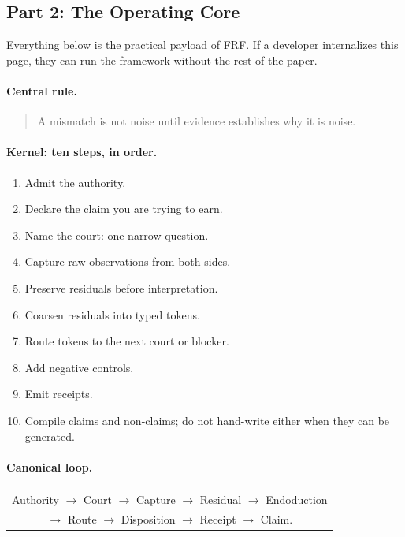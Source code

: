 \documentclass[11pt,a4paper]{article}
\newcommand{\frf}{\textsc{FRF}}
\begin{document}
\subsection{Part 2: The Operating Core}

Everything below is the practical payload of \frf{}. If a developer internalizes this page, they can run the framework without the rest of the paper.

\paragraph{Central rule.}
\begin{quote}
A mismatch is not noise until evidence establishes why it is noise.
\end{quote}

\paragraph{Kernel: ten steps, in order.}
\begin{enumerate}
\item Admit the authority.
\item Declare the claim you are trying to earn.
\item Name the court: one narrow question.
\item Capture raw observations from both sides.
\item Preserve residuals before interpretation.
\item Coarsen residuals into typed tokens.
\item Route tokens to the next court or blocker.
\item Add negative controls.
\item Emit receipts.
\item Compile claims and non-claims; do not hand-write either when they can be generated.
\end{enumerate}

\paragraph{Canonical loop.}
\begin{center}
\small
\begin{tabular}{c}
Authority \(\rightarrow\) Court \(\rightarrow\) Capture \(\rightarrow\) Residual \(\rightarrow\) Endoduction\\
\(\rightarrow\) Route \(\rightarrow\) Disposition \(\rightarrow\) Receipt \(\rightarrow\) Claim.
\end{tabular}
\end{center}
\end{document}
